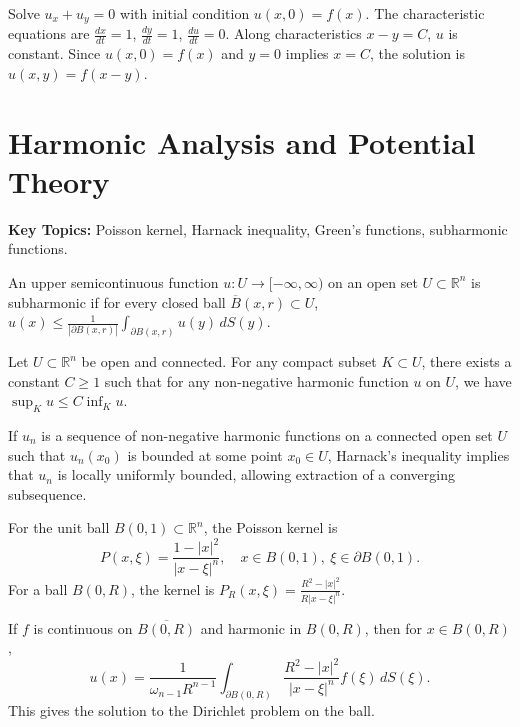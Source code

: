 \begin{example}
Solve $u_x + u_y = 0$ with initial condition $u(x,0) = f(x)$. The characteristic equations are $\frac{dx}{dt} = 1$, $\frac{dy}{dt} = 1$, $\frac{du}{dt} = 0$. Along characteristics $x - y = C$, $u$ is constant. Since $u(x,0) = f(x)$ and $y = 0$ implies $x = C$, the solution is $u(x,y) = f(x-y)$.
\end{example}

\section{Harmonic Analysis and Potential Theory}

\textbf{Key Topics:} Poisson kernel, Harnack inequality, Green's functions, subharmonic functions.

\begin{definition}
An upper semicontinuous function $u: U \to [-\infty, \infty)$ on an open set $U \subset \mathbb{R}^n$ is subharmonic if for every closed ball $\overline{B}(x, r) \subset U$, $u(x) \leq \frac{1}{| \partial B(x,r) |} \int_{\partial B(x,r)} u(y) \, dS(y)$.
\end{definition}

\begin{theorem}
Let $U \subset \mathbb{R}^n$ be open and connected. For any compact subset $K \subset U$, there exists a constant $C \geq 1$ such that for any non-negative harmonic function $u$ on $U$, we have $\sup_K u \leq C \inf_K u$.
\end{theorem}

\begin{example}
If $u_n$ is a sequence of non-negative harmonic functions on a connected open set $U$ such that $u_n(x_0)$ is bounded at some point $x_0 \in U$, Harnack's inequality implies that $u_n$ is locally uniformly bounded, allowing extraction of a converging subsequence.
\end{example}

\begin{definition}
For the unit ball $B(0,1) \subset \mathbb{R}^n$, the Poisson kernel is
\[
P(x,\xi) = \frac{1-|x|^2}{|x-\xi|^n}, \quad x \in B(0,1), \ \xi \in \partial B(0,1).
\]
For a ball $B(0,R)$, the kernel is $P_R(x,\xi) = \frac{R^2-|x|^2}{R|x-\xi|^n}$.
\end{definition}

\begin{example}
If $f$ is continuous on $\overline{B(0,R)}$ and harmonic in $B(0,R)$, then for $x \in B(0,R)$,
\[
u(x) = \frac{1}{\omega_{n-1}R^{n-1}} \int_{\partial B(0,R)} \frac{R^2-|x|^2}{|x-\xi|^n} f(\xi) \, dS(\xi).
\]
This gives the solution to the Dirichlet problem on the ball.
\end{example}

